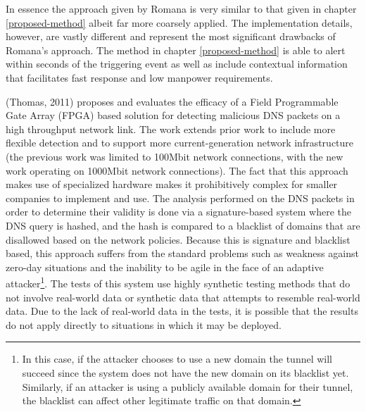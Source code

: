 \documentclass[12pt]{report}
\theoremstyle{remark}
\theoremstyle{definition}
\theoremstyle{definition}
\theoremstyle{definition}
\begin{document}
In essence the approach given by Romana is very similar to that given in chapter
\ref{proposed-method} albeit far more coarsely applied. The implementation
details, however, are vastly different and represent the most significant
drawbacks of Romana's approach. The method in chapter \ref{proposed-method} is
able to alert within seconds of the triggering event as well as include
contextual information that facilitates fast response and low manpower
requirements.

(Thomas, 2011)\cite{Thomas2011} proposes and evaluates the efficacy of a Field
Programmable Gate Array (FPGA) based solution for detecting malicious DNS
packets on a high throughput network link. The work extends prior work to
include more flexible detection and to support more current-generation network
infrastructure (the previous work was limited to 100Mbit network connections,
with the new work operating on 1000Mbit network connections). The fact that this
approach makes use of specialized hardware makes it prohibitively complex for
smaller companies to implement and use. The analysis performed on the DNS
packets in order to determine their validity is done via a signature-based
system where the DNS query is hashed, and the hash is compared to a blacklist of
domains that are disallowed based on the network policies. Because this is
signature and blacklist based, this approach suffers from the standard problems
such as weakness against zero-day situations and the inability to be agile in
the face of an adaptive attacker\footnote{In this case, if the attacker chooses
to use a new domain the tunnel will succeed since the system does not have the
new domain on its blacklist yet. Similarly, if an attacker is using a publicly
available domain for their tunnel, the blacklist can affect other legitimate
traffic on that domain.}. The tests of this system use highly synthetic testing
methods that do not involve real-world data or synthetic data that attempts to
resemble real-world data. Due to the lack of real-world data in the tests, it is
possible that the results do not apply directly to situations in which it may be
deployed.
\end{document}
